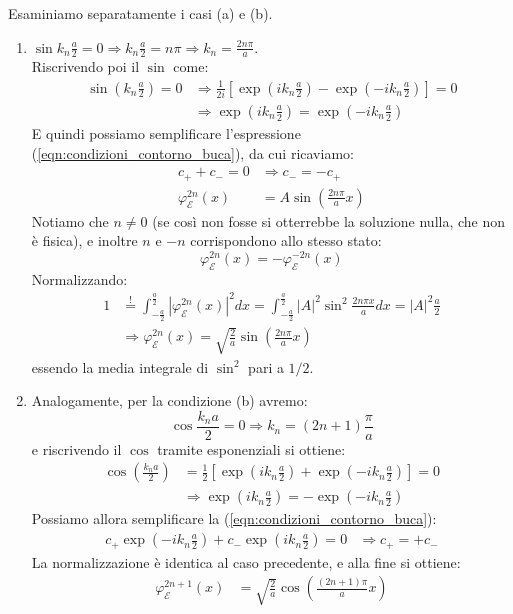 \documentclass[../../FisicaTeorica.tex]{subfiles}
\begin{document}
Esaminiamo separatamente i casi (a) e (b).
\begin{enumerate}[label=\alph*)]
\item $\displaystyle \sin k_n \frac{a}{2} = 0\Rightarrow k_n \frac{a}{2}=n\pi \Rightarrow k_n = \frac{2n\pi}{a}$.\\
Riscrivendo poi il $\sin$ come:
\begin{align*}
\sin\left(k_n\frac{a}{2}\right)=0&\Rightarrow \frac{1}{2i}\left[
\exp\left(ik_n\frac{a}{2}\right)-\exp\left(-ik_n\frac{a}{2}\right)
\right] = 0\\
&\Rightarrow \exp\left({ik_n\frac{a}{2}}\right)=\exp\left({-ik_n\frac{a}{2}}\right)
\end{align*}
E quindi possiamo semplificare l'espressione (\ref{eqn:condizioni_contorno_buca}), da cui ricaviamo:
\begin{align*}
c_+ + c_- = 0 &\Rightarrow c_- = -c_+\\
\varphi_\mathcal{E}^{2n}(x)&=A\sin \left(\frac{2n\pi}{a}x\right)
\end{align*}
Notiamo che $n\neq 0$ (se così non fosse si otterrebbe la soluzione nulla, che non è fisica), e inoltre $n$ e $-n$ corrispondono allo stesso stato:
\[
\varphi_\mathcal{E}^{2n}(x)=-\varphi_{\mathcal{E}}^{-2n}(x)
\]
Normalizzando:
\begin{align*}
1 &\overset{!}{=} \int_{-\frac{a}{2}}^{\frac{a}{2}} |\varphi_\mathcal{E}^{2n}(x)|^2 dx = \int_{-\frac{a}{2}}^{\frac{a}{2}} |A|^2 \sin^2 \frac{2n\pi x}{a}dx = |A|^2 \frac{a}{2} \\
&\Rightarrow \varphi_\mathcal{E}^{2n}(x)=\sqrt{\frac{2}{a}}\sin \left(\frac{2n\pi}{a}x\right)
\end{align*}
essendo la media integrale di $\sin^2$ pari a $1/2$.
\item Analogamente, per la condizione (b) avremo:
\[
\cos\frac{k_n a}{2}=0 \Rightarrow k_n = (2n+1)\frac{\pi}{a}
\]
e riscrivendo il $\cos$ tramite esponenziali si ottiene:
\begin{align*}
\cos\left(\frac{k_n a}{2}\right ) &= \frac{1}{2}\left [
\exp\left(i k_n \frac{a}{2}\right)+\exp\left(-ik_n\frac{a}{2}\right)
\right ] = 0\\
&\Rightarrow \exp\left({ik_n \frac{a}{2}}\right)=-\exp\left({-ik_n\frac{a}{2}}\right)
\end{align*}
Possiamo allora semplificare la (\ref{eqn:condizioni_contorno_buca}):
\begin{align*}
c_+ \exp\left({-ik_n\frac{a}{2}}\right)+c_- \exp\left({ik_n \frac{a}{2}}\right)=0 &\Rightarrow c_+ = +c_-
\end{align*}
La normalizzazione è identica al caso precedente, e alla fine si ottiene:
\begin{align*}
\varphi_{\mathcal{E}}^{2n+1}(x)&=\sqrt{\frac{2}{a}}\cos\left(\frac{(2n+1)\pi}{a} x\right)
\end{align*}
\end{enumerate}
\end{document}

